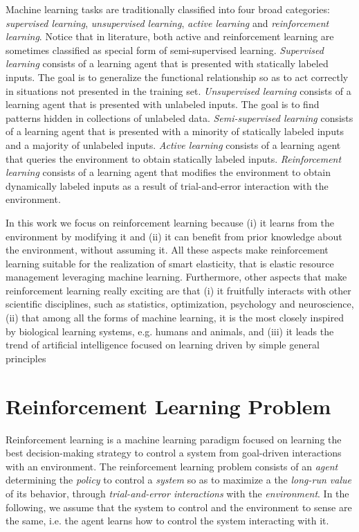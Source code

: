 Machine learning tasks are traditionally classified into four broad categories: \textit{supervised learning}, \textit{unsupervised learning}, \textit{active learning} and \textit{reinforcement learning}.
%
Notice that in literature, both active and reinforcement learning are sometimes classified as special form of semi-supervised learning.
%
\textit{Supervised learning} consists of a learning agent that is presented with statically labeled inputs. The goal is to generalize the functional relationship so as to act correctly in situations not presented in the training set.
%
\textit{Unsupervised learning} consists of a learning agent that is presented with unlabeled inputs. The goal is to find patterns hidden in collections of unlabeled data.
%
\textit{Semi-supervised learning} consists of a learning agent that is presented with a minority of statically labeled inputs and a majority of unlabeled inputs.
%
\textit{Active learning} consists of a learning agent that queries the environment to obtain statically labeled inputs.
%
\textit{Reinforcement learning} consists of a learning agent that modifies the environment to obtain dynamically labeled inputs as a result of trial-and-error interaction with the environment.

In this work we focus on reinforcement learning because 
(i) it learns from the environment by modifying it and
(ii) it can benefit from prior knowledge about the environment, without assuming it.
%
All these aspects make reinforcement learning suitable for the realization of smart elasticity, that is elastic resource management leveraging machine learning.
%
Furthermore, other aspects that make reinforcement learning really exciting are that
(i) it fruitfully interacts with other scientific disciplines, such as statistics, optimization, psychology and neuroscience, 
(ii) that among all the forms of machine learning, it is the most closely inspired by biological learning systems, e.g. humans and animals, and
(iii) it leads the trend of artificial intelligence focused on learning driven by simple general principles


\section{Reinforcement Learning Problem}
\label{sec:reinforcement-learning-reinforcement-learning-problem}
Reinforcement learning is a machine learning paradigm focused on learning the best decision-making strategy to control a system from goal-driven interactions with an environment.
%
The reinforcement learning problem consists of an \textit{agent} determining the \textit{policy} to control a \textit{system} so as to maximize a the \textit{long-run value} of its behavior, through \textit{trial-and-error interactions} with the \textit{environment}.
%
In the following, we assume that the system to control and the environment to sense are the same, i.e. the agent learns how to control the system interacting with it.


